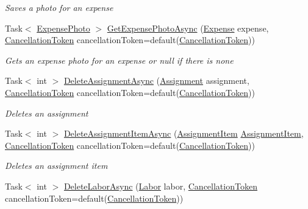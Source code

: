 \begin{DoxyCompactItemize}
\begin{DoxyCompactList}\small\item\em Saves a photo for an expense \end{DoxyCompactList}\item 
Task$<$ \hyperlink{class_field_service_1_1_data_1_1_expense_photo}{Expense\+Photo} $>$ \hyperlink{interface_field_service_1_1_i_assignment_service_afd6518a839fbe178de83044d30836c2c}{Get\+Expense\+Photo\+Async} (\hyperlink{class_field_service_1_1_data_1_1_expense}{Expense} expense, \hyperlink{_view_models_2_assignment_view_model_8cs_aba80ec766846c61f55644fd23860cb18}{Cancellation\+Token} cancellation\+Token=default(\hyperlink{_view_models_2_assignment_view_model_8cs_aba80ec766846c61f55644fd23860cb18}{Cancellation\+Token}))
\begin{DoxyCompactList}\small\item\em Gets an expense photo for an expense or null if there is none \end{DoxyCompactList}\item 
Task$<$ int $>$ \hyperlink{interface_field_service_1_1_i_assignment_service_a2852dea4a37ed70c41b2e8e997936eeb}{Delete\+Assignment\+Async} (\hyperlink{class_field_service_1_1_data_1_1_assignment}{Assignment} assignment, \hyperlink{_view_models_2_assignment_view_model_8cs_aba80ec766846c61f55644fd23860cb18}{Cancellation\+Token} cancellation\+Token=default(\hyperlink{_view_models_2_assignment_view_model_8cs_aba80ec766846c61f55644fd23860cb18}{Cancellation\+Token}))
\begin{DoxyCompactList}\small\item\em Deletes an assignment \end{DoxyCompactList}\item 
Task$<$ int $>$ \hyperlink{interface_field_service_1_1_i_assignment_service_a15a28d08be1e14567bf7b9a0ba64528b}{Delete\+Assignment\+Item\+Async} (\hyperlink{class_field_service_1_1_data_1_1_assignment_item}{Assignment\+Item} \hyperlink{class_field_service_1_1_data_1_1_assignment_item}{Assignment\+Item}, \hyperlink{_view_models_2_assignment_view_model_8cs_aba80ec766846c61f55644fd23860cb18}{Cancellation\+Token} cancellation\+Token=default(\hyperlink{_view_models_2_assignment_view_model_8cs_aba80ec766846c61f55644fd23860cb18}{Cancellation\+Token}))
\begin{DoxyCompactList}\small\item\em Deletes an assignment item \end{DoxyCompactList}\item 
Task$<$ int $>$ \hyperlink{interface_field_service_1_1_i_assignment_service_a57066185843cd11c1adbf3f4ae483672}{Delete\+Labor\+Async} (\hyperlink{class_field_service_1_1_data_1_1_labor}{Labor} labor, \hyperlink{_view_models_2_assignment_view_model_8cs_aba80ec766846c61f55644fd23860cb18}{Cancellation\+Token} cancellation\+Token=default(\hyperlink{_view_models_2_assignment_view_model_8cs_aba80ec766846c61f55644fd23860cb18}{Cancellation\+Token}))

\end{DoxyCompactItemize}
